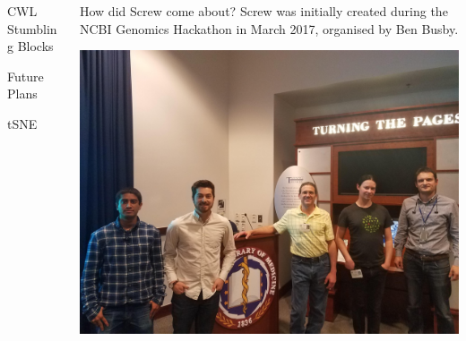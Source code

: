 \documentclass{beamer}
\begin{document}
\begin{frame}
\begin{columns}[t]
\begin{column}{.65\textwidth}
\begin{columns}[t,totalwidth=\textwidth]
\begin{column}{.48\textwidth}
   

    
\begin{block}{CWL Stumbling Blocks}

\end{block}



\begin{block}{Future Plans}

tSNE

\end{block}
\end{column}

	\begin{column}{.48\textwidth}
\begin{block}{How did Screw come about?}
Screw was initially created during the NCBI Genomics Hackathon in March 2017, organised by Ben Busby.
\begin{center}
  \includegraphics[width=\textwidth]{figures/hackathon_team.jpg}
\end{center}

\end{block}


 
\end{column}

  \end{columns}
\end{column}


\end{columns}

\end{frame}
\end{document}
